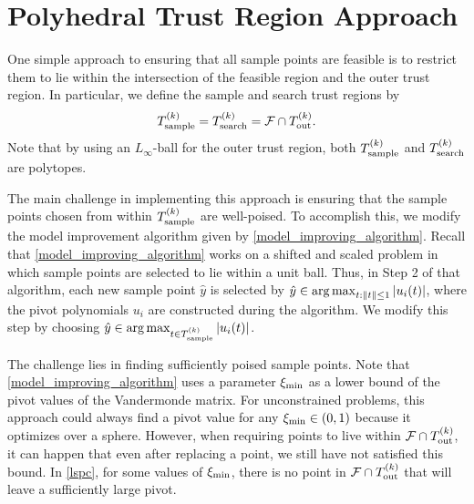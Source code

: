 \section{Polyhedral Trust Region Approach}
\label{sec:polyhedral}

One simple approach to ensuring that all sample points are feasible is to restrict them to lie within the intersection of the feasible region and the outer trust region.
In particular,  we define the sample and search trust regions by
\[ {T_{\text{sample}}^{(k)}} = {T_{\text{search}}^{(k)}} = {\mathcal F} \cap {T_{\text{out}}^{(k)}}.\]
Note that by using an $L_{\infty}$-ball for the outer trust region, both ${T_{\text{sample}}^{(k)}}$ and ${T_{\text{search}}^{(k)}}$ are polytopes.
 
The main challenge in implementing this approach is ensuring that the sample points chosen from within ${T_{\text{sample}}^{(k)}}$ are well-poised.
To accomplish this, we modify the model improvement algorithm given by \cref{model_improving_algorithm}.   
Recall that \cref{model_improving_algorithm} works on a shifted and scaled problem in which sample points are selected to lie within a unit ball.
Thus,  in Step 2 of that algorithm,  each new sample point $\hat{y}$  is selected by  
$\hat{y} \in \operatorname*{arg\,max}_{t:{\left\|t\right\|} \le 1} \left|u_i(t)\right|$, where the pivot polynomials $u_i$ are constructed during the algorithm.  
We modify this step by choosing $\hat{y} \in \operatorname*{arg\,max}_{t\in {T_{\text{sample}}^{(k)}}} \left|u_i(t)\right|$.  




The challenge lies in finding sufficiently poised sample points.
Note that \cref{model_improving_algorithm} uses a parameter $  \xi_{\text{min}} $ as a lower bound of the pivot values of the Vandermonde matrix.
For unconstrained problems, this approach could always find a pivot value for any $ \xi_{\text{min}} \in (0,1)$ because it optimizes over a sphere.
However, when requiring points to live within $ {\mathcal F} \cap {T_{\text{out}}^{(k)}} $, it can happen that even after replacing a point, we still have not satisfied this bound.
In \cref{lspc}, for some values of $  \xi_{\text{min}} $, there is no point in $ {\mathcal F} \cap {T_{\text{out}}^{(k)}} $ that will leave a sufficiently large pivot.

